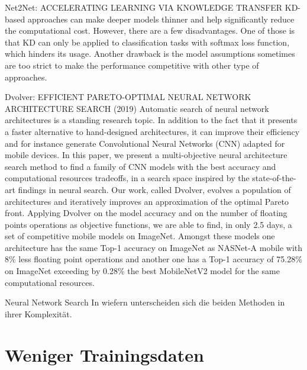 \documentclass[10pt]{beamer}
\begin{document}
\begin{frame}{Net2Net: ACCELERATING LEARNING
VIA KNOWLEDGE TRANSFER}
KD-based approaches can make deeper models
thinner and help significantly reduce the computational cost.
However, there are a few disadvantages. One of those is that
KD can only be applied to classification tasks with softmax
loss function, which hinders its usage. Another drawback is
the model assumptions sometimes are too strict to make the
performance competitive with other type of approaches.
\end{frame}


\begin{frame}{Dvolver: EFFICIENT PARETO-OPTIMAL NEURAL
NETWORK ARCHITECTURE SEARCH (2019)}
Automatic search of neural network architectures is a standing research topic. In addition to the fact that it presents a faster alternative to hand-designed architectures, it can improve their efficiency and for instance generate Convolutional Neural Networks (CNN) adapted for mobile devices. In this paper, we present a multi-objective neural architecture search method to find a family of CNN models with the best accuracy and computational resources tradeoffs, in a search space inspired by the state-of-the-art findings in neural search. Our work, called Dvolver, evolves a population of architectures and iteratively improves an approximation of the optimal Pareto front. Applying Dvolver on the model accuracy and on the
number of floating points operations as objective functions, we are able to find, in only 2.5 days, a set of competitive mobile models on ImageNet. Amongst these models one architecture has the same Top-1 accuracy on ImageNet as NASNet-A mobile with 8\% less floating point operations and another one has a Top-1 accuracy of 75.28\% on ImageNet exceeding by 0.28\% the best MobileNetV2 model for the same computational resources.
\end{frame}

\begin{frame}{Neural Network Search}
 In wiefern unterscheiden sich die beiden Methoden in ihrer Komplexität.
\end{frame}

\section{Weniger Trainingsdaten}
\end{document}
